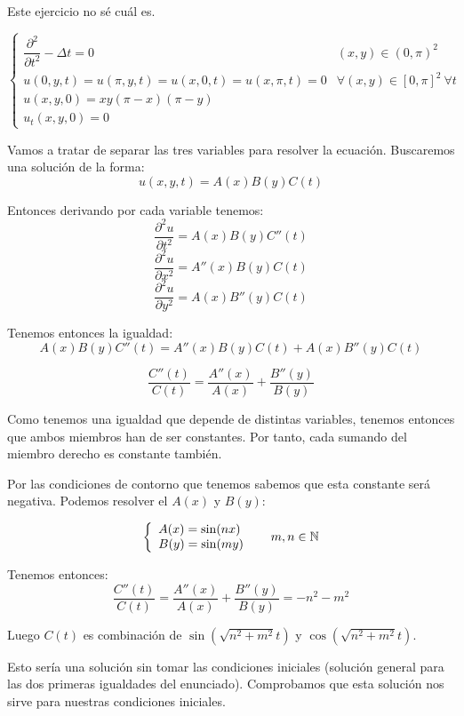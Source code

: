 \documentclass[openany]{book}
\begin{document}
\begin{exercise} Este ejercicio no sé cuál es.

  $$ \left\{
  \begin{array}{ll}
    \dfrac{\partial ^2}{\partial t^2}- \Delta t = 0 & (x,y) \in (0,\pi)^2\\ 
    u(0,y,t) = u(\pi,y,t) = u(x,0,t) = u(x,\pi,t) = 0 & \forall  (x,y) \in [0,\pi]^2\ \forall t\\ 
    u(x,y,0) = xy(\pi-x)(\pi-y)\\ 
    u_{t}(x,y,0) = 0
  \end{array}
  \right. $$

  Vamos a tratar de separar las tres variables para resolver la ecuación. Buscaremos una solución de la forma:
  $$ u(x,y,t) = A(x)B(y)C(t) $$

  Entonces derivando por cada variable tenemos:
  $$ \dfrac{\partial ^2 u}{\partial t^2} = A(x)B(y)C''(t) $$
  $$ \dfrac{\partial ^2 u}{\partial x^2} = A''(x)B(y)C(t) $$
  $$ \dfrac{\partial ^2u}{\partial y^2} = A(x)B''(y)C(t) $$

  Tenemos entonces la igualdad:
  $$ A(x)B(y)C''(t) = A''(x)B(y)C(t) + A(x)B''(y)C(t) $$

  $$ \dfrac{C''(t)}{C(t)} = \dfrac{A''(x)}{A(x)} + \dfrac{B''(y)}{B(y)} $$

  Como tenemos una igualdad que depende de distintas variables, tenemos entonces que ambos miembros han de ser constantes. Por tanto, cada sumando del miembro derecho es constante también.

  Por las condiciones de contorno que tenemos sabemos que esta constante será negativa. Podemos resolver el $ A(x) $ y $ B(y) $:

  $$ \left\{
  \begin{array}{l}
    A(x) = \sin(nx)\\ 
    B(y) = \sin(my)
  \end{array}
  \right.\hspace{5mm} m,n \in \mathbb{N}  $$

  Tenemos entonces:
  $$\dfrac{C''(t)}{C(t)}  =  \dfrac{A''(x)}{A(x)} + \dfrac{B''(y)}{B(y)} = -n^2-m^2 $$

  Luego $ C(t)  $ es combinación de $ \sin(\sqrt{n^2+m^2}t) $ y $ \cos(\sqrt{n^2+m^2}t) $.

  Esto sería una solución sin tomar las condiciones iniciales (solución general para las dos primeras igualdades del enunciado). Comprobamos que esta solución nos sirve para nuestras condiciones iniciales.


\end{exercise}
\end{document}
